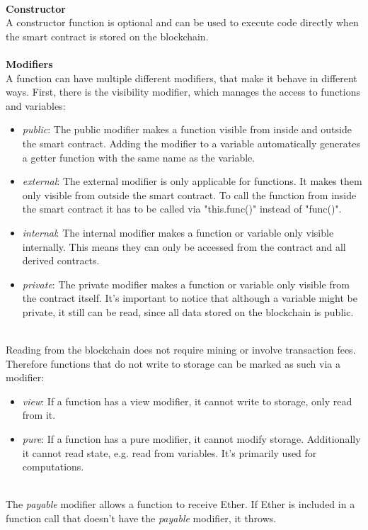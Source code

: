 \leavevmode
\\
\textbf{Constructor}\\
A constructor function is optional and can be used to execute code directly when the smart contract is stored on the blockchain\cite{doc-constructor}.
\\\\
\textbf{Modifiers}\\
A function can have multiple different modifiers, that make it behave in different ways\cite{doc-modifiers}.
First, there is the visibility modifier, which manages the access to functions and variables:
\begin{itemize}
  \item \textit{public}: The public modifier makes a function visible from inside and outside the smart contract. Adding the modifier to a variable automatically generates a getter function with the same name as the variable.
  \item \textit{external}: The external modifier is only applicable for functions. It makes them only visible from outside the smart contract. To call the function from inside the smart contract it has to be called via "this.func()" instead of "func()".
  \item \textit{internal}: The internal modifier makes a function or variable only visible internally. This means they can only be accessed from the contract and all derived contracts.
  \item \textit{private}: The private modifier makes a function or variable only visible from the contract itself. It's important to notice that although a variable might be private, it still can be read, since all data stored on the blockchain is public.
\end{itemize} 
\leavevmode
\\
Reading from the blockchain does not require mining or involve transaction fees. Therefore functions that do not write to storage can be marked as such via a modifier:
\begin{itemize}
  \item \textit{view}: If a function has a view modifier, it cannot write to storage, only read from it.
  \item \textit{pure}: If a function has a pure modifier, it cannot modify storage. Additionally it cannot read state, e.g. read from variables. It's primarily used for computations.
\end{itemize}
\leavevmode
\\
The \textit{payable} modifier allows a function to receive Ether. If Ether is included in a function call that doesn't have the \textit{payable} modifier, it throws.
